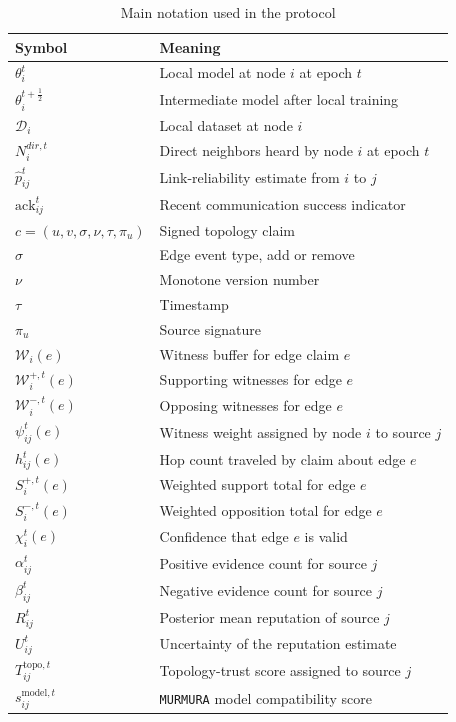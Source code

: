 \documentclass[journal]{IEEEtran}
\theoremstyle{definition}
\theoremstyle{remark}
\begin{document}
\begin{table}[t]
\centering
\caption{Main notation used in the protocol}
\label{tab:notation}
\begin{tabular}{ll}
\toprule
Symbol & Meaning \\
\midrule
$\theta_i^t$ & Local model at node $i$ at epoch $t$ \\
$\theta_i^{t+\frac{1}{2}}$ & Intermediate model after local training \\
$\mathcal{D}_i$ & Local dataset at node $i$ \\
$N_i^{dir,t}$ & Direct neighbors heard by node $i$ at epoch $t$ \\
$\hat{p}_{ij}^t$ & Link-reliability estimate from $i$ to $j$ \\
$\mathrm{ack}_{ij}^t$ & Recent communication success indicator \\
$c=(u,v,\sigma,\nu,\tau,\pi_u)$ & Signed topology claim \\
$\sigma$ & Edge event type, add or remove \\
$\nu$ & Monotone version number \\
$\tau$ & Timestamp \\
$\pi_u$ & Source signature \\
$\mathcal{W}_i(e)$ & Witness buffer for edge claim $e$ \\
$\mathcal{W}_i^{+,t}(e)$ & Supporting witnesses for edge $e$ \\
$\mathcal{W}_i^{-,t}(e)$ & Opposing witnesses for edge $e$ \\
$\psi_{ij}^t(e)$ & Witness weight assigned by node $i$ to source $j$ \\
$h_{ij}^t(e)$ & Hop count traveled by claim about edge $e$ \\
$S_i^{+,t}(e)$ & Weighted support total for edge $e$ \\
$S_i^{-,t}(e)$ & Weighted opposition total for edge $e$ \\
$\chi_i^t(e)$ & Confidence that edge $e$ is valid \\
$\alpha_{ij}^t$ & Positive evidence count for source $j$ \\
$\beta_{ij}^t$ & Negative evidence count for source $j$ \\
$R_{ij}^t$ & Posterior mean reputation of source $j$ \\
$U_{ij}^t$ & Uncertainty of the reputation estimate \\
$T_{ij}^{\text{topo},t}$ & Topology-trust score assigned to source $j$ \\
$s_{ij}^{\text{model},t}$ & \texttt{MURMURA} model compatibility score \\

\end{tabular}
\end{table}
\end{document}
